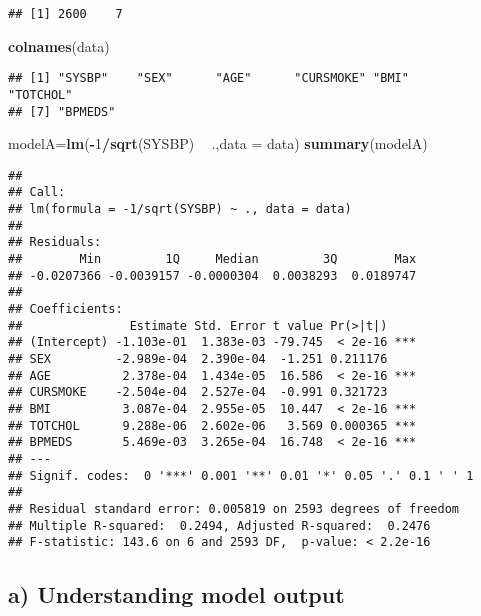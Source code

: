 \documentclass[]{article}
\newenvironment{Shaded}{\begin{snugshade}}{\end{snugshade}}
\newcommand{\KeywordTok}[1]{\textcolor[rgb]{0.13,0.29,0.53}{\textbf{#1}}}
\newcommand{\DataTypeTok}[1]{\textcolor[rgb]{0.13,0.29,0.53}{#1}}
\newcommand{\DecValTok}[1]{\textcolor[rgb]{0.00,0.00,0.81}{#1}}
\newcommand{\StringTok}[1]{\textcolor[rgb]{0.31,0.60,0.02}{#1}}
\newcommand{\OperatorTok}[1]{\textcolor[rgb]{0.81,0.36,0.00}{\textbf{#1}}}
\newcommand{\NormalTok}[1]{#1}
\begin{document}
\begin{verbatim}
## [1] 2600    7
\end{verbatim}

\begin{Shaded}
\begin{Highlighting}[]
\KeywordTok{colnames}\NormalTok{(data)}
\end{Highlighting}
\end{Shaded}

\begin{verbatim}
## [1] "SYSBP"    "SEX"      "AGE"      "CURSMOKE" "BMI"      "TOTCHOL" 
## [7] "BPMEDS"
\end{verbatim}

\begin{Shaded}
\begin{Highlighting}[]
\NormalTok{modelA=}\KeywordTok{lm}\NormalTok{(}\OperatorTok{-}\DecValTok{1}\OperatorTok{/}\KeywordTok{sqrt}\NormalTok{(SYSBP) }\OperatorTok{~}\StringTok{ }\NormalTok{.,}\DataTypeTok{data =}\NormalTok{ data)}
\KeywordTok{summary}\NormalTok{(modelA)}
\end{Highlighting}
\end{Shaded}

\begin{verbatim}
## 
## Call:
## lm(formula = -1/sqrt(SYSBP) ~ ., data = data)
## 
## Residuals:
##        Min         1Q     Median         3Q        Max 
## -0.0207366 -0.0039157 -0.0000304  0.0038293  0.0189747 
## 
## Coefficients:
##               Estimate Std. Error t value Pr(>|t|)    
## (Intercept) -1.103e-01  1.383e-03 -79.745  < 2e-16 ***
## SEX         -2.989e-04  2.390e-04  -1.251 0.211176    
## AGE          2.378e-04  1.434e-05  16.586  < 2e-16 ***
## CURSMOKE    -2.504e-04  2.527e-04  -0.991 0.321723    
## BMI          3.087e-04  2.955e-05  10.447  < 2e-16 ***
## TOTCHOL      9.288e-06  2.602e-06   3.569 0.000365 ***
## BPMEDS       5.469e-03  3.265e-04  16.748  < 2e-16 ***
## ---
## Signif. codes:  0 '***' 0.001 '**' 0.01 '*' 0.05 '.' 0.1 ' ' 1
## 
## Residual standard error: 0.005819 on 2593 degrees of freedom
## Multiple R-squared:  0.2494, Adjusted R-squared:  0.2476 
## F-statistic: 143.6 on 6 and 2593 DF,  p-value: < 2.2e-16
\end{verbatim}

\subsection{a) Understanding model
output}\label{a-understanding-model-output}
\end{document}
